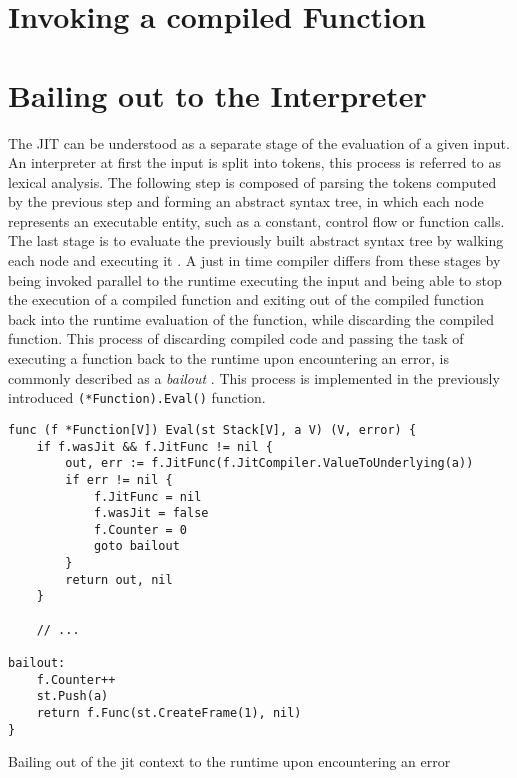 \section{Invoking a compiled Function}


\section{Bailing out to the Interpreter}

The JIT can be understood as a separate stage of the evaluation of a given
input. An interpreter at first the input is split into tokens, this process is
referred to as lexical analysis. The following step is composed of parsing the
tokens computed by the previous step and forming an abstract syntax tree, in
which each node represents an executable entity, such as a constant, control
flow or function calls. The last stage is to evaluate the previously built
abstract syntax tree by walking each node and executing it
\cite{hippisley2010lexical}. A just in time compiler differs from these stages
by being invoked parallel to the runtime executing the input and being able to
stop the execution of a compiled function and exiting out of the compiled
function back into the runtime evaluation of the function, while discarding the
compiled function. This process of discarding compiled code and passing the
task of executing a function back to the runtime upon encountering an error, is
commonly described as a \textit{bailout} \cite{aycock2003brief}. This process
is implemented in the previously introduced \texttt{(*Function).Eval()}
function.

\begin{listing}[H]
    \begin{verbatim}
func (f *Function[V]) Eval(st Stack[V], a V) (V, error) {
    if f.wasJit && f.JitFunc != nil {
        out, err := f.JitFunc(f.JitCompiler.ValueToUnderlying(a))
        if err != nil {
            f.JitFunc = nil
            f.wasJit = false
            f.Counter = 0
            goto bailout
        }
        return out, nil
    }

    // ...

bailout:
    f.Counter++
    st.Push(a)
    return f.Func(st.CreateFrame(1), nil)
}
    \end{verbatim}
    \caption{Bailing out of the jit context to the runtime upon encountering an error}
    \label{code:jit-bailout}
\end{listing}

